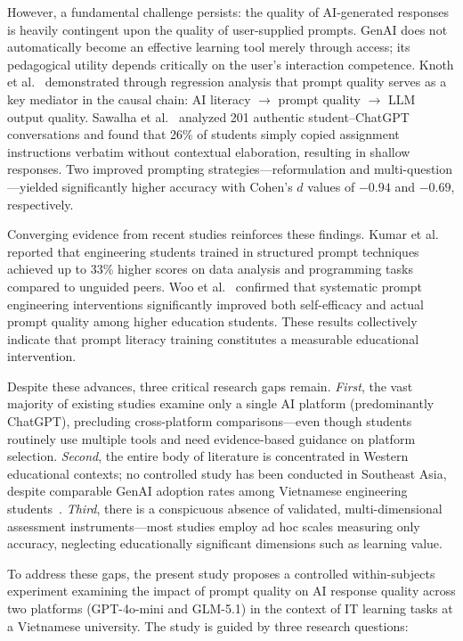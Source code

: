 \documentclass[runningheads]{llncs}
\begin{document}
However, a fundamental challenge persists: the quality of AI-generated responses is heavily contingent upon the quality of user-supplied prompts. GenAI does not automatically become an effective learning tool merely through access; its pedagogical utility depends critically on the user's interaction competence. Knoth et al.~\cite{Knoth2024} demonstrated through regression analysis that prompt quality serves as a key mediator in the causal chain: AI literacy $\rightarrow$ prompt quality $\rightarrow$ LLM output quality. Sawalha et al.~\cite{Sawalha2024} analyzed 201 authentic student--ChatGPT conversations and found that 26\% of students simply copied assignment instructions verbatim without contextual elaboration, resulting in shallow responses. Two improved prompting strategies---reformulation and multi-question---yielded significantly higher accuracy with Cohen's $d$ values of $-0.94$ and $-0.69$, respectively.

Converging evidence from recent studies reinforces these findings. Kumar et al.~\cite{Kumar2025} reported that engineering students trained in structured prompt techniques achieved up to 33\% higher scores on data analysis and programming tasks compared to unguided peers. Woo et al.~\cite{Woo2025} confirmed that systematic prompt engineering interventions significantly improved both self-efficacy and actual prompt quality among higher education students. These results collectively indicate that prompt literacy training constitutes a measurable educational intervention.

Despite these advances, three critical research gaps remain. \emph{First}, the vast majority of existing studies examine only a single AI platform (predominantly ChatGPT), precluding cross-platform comparisons---even though students routinely use multiple tools and need evidence-based guidance on platform selection. \emph{Second}, the entire body of literature is concentrated in Western educational contexts; no controlled study has been conducted in Southeast Asia, despite comparable GenAI adoption rates among Vietnamese engineering students~\cite{Bui2025}. \emph{Third}, there is a conspicuous absence of validated, multi-dimensional assessment instruments---most studies employ ad hoc scales measuring only accuracy, neglecting educationally significant dimensions such as learning value.

To address these gaps, the present study proposes a controlled within-subjects experiment examining the impact of prompt quality on AI response quality across two platforms (GPT-4o-mini and GLM-5.1) in the context of IT learning tasks at a Vietnamese university. The study is guided by three research questions:
\end{document}

